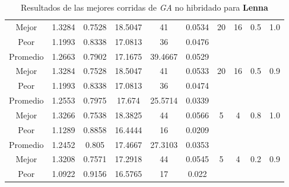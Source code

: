 \begin{table}[h!]
\begin{center}
\begin{tabular}{|c|c|c|c|c|c|c|c|c|c|}
            \cline{1-6}
            Mejor & 1.3284 & 0.7528  & 18.5047 & 41 & 0.0534 & 20 & 16 & 0.5 & 1.0\\
            \cline{1-6}
            Peor & 1.1993 & 0.8338  & 17.0813 & 36 & 0.0476 &  &  &  & \\
        \hline
        \hline
            Promedio  & 1.2663 & 0.7902 & 17.1675 & 39.4667 & 0.0529 &  &  &  & \\
            \cline{1-6}
            Mejor & 1.3284 & 0.7528  & 18.5047 & 41 & 0.0533 & 20 & 16 & 0.5 & 0.9\\
            \cline{1-6}
            Peor & 1.1993 & 0.8338  & 17.0813 & 36 & 0.0474 &  &  &  & \\
        \hline
        \hline
            Promedio  & 1.2553 & 0.7975 & 17.674 & 25.5714 & 0.0339 &  &  &  & \\
            \cline{1-6}
            Mejor & 1.3266 & 0.7538  & 18.3825 & 44 & 0.0566 & 5 & 4 & 0.8 & 1.0\\
            \cline{1-6}
            Peor & 1.1289 & 0.8858  & 16.4444 & 16 & 0.0209 &  &  &  & \\
        \hline
        \hline
            Promedio  & 1.2452 & 0.805 & 17.4667 & 27.3103 & 0.0353 &  &  &  & \\
            \cline{1-6}
            Mejor & 1.3208 & 0.7571  & 17.2918 & 44 & 0.0545 & 5 & 4 & 0.2 & 0.9\\
            \cline{1-6}
            Peor & 1.0922 & 0.9156  & 16.5765 & 17 & 0.022 &  &  &  & \\
        \hline
        \end{tabular}
        \caption{Resultados de las mejores corridas de \emph{GA} no hibridado para {\bf Lenna}}
        \label{tb:tablegaalgimg}
    \end{center}
\end{table}


